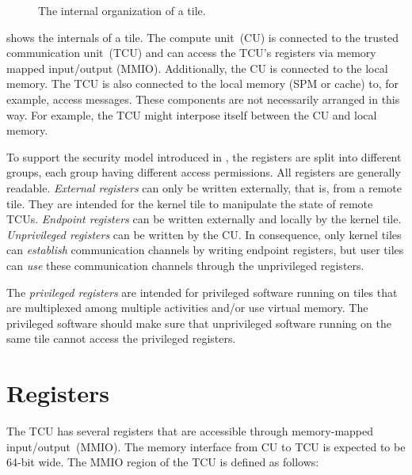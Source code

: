 \begin{figure}[h]
  \caption{The internal organization of a tile.}
  \label{fig:tileinternal}
\end{figure}

 shows the internals of a tile. The compute unit~(CU) is
connected to the trusted communication unit~(TCU) and can access the TCU's registers via memory
mapped input/output (MMIO). Additionally, the CU is connected to the local memory. The TCU is also
connected to the local memory (SPM or cache) to, for example, access messages. These components are
not necessarily arranged in this way. For example, the TCU might interpose itself between the CU and
local memory.

To support the security model introduced in , the registers are split into
different groups, each group having different access permissions. All registers are generally
readable. \emph{External registers} can only be written externally, that is, from a remote tile. They
are intended for the kernel tile to manipulate the state of remote TCUs. \emph{Endpoint registers} can
be written externally and locally by the kernel tile. \emph{Unprivileged registers} can be written by
the CU. In consequence, only kernel tiles can \emph{establish} communication channels by writing
endpoint registers, but user tiles can \emph{use} these communication channels through the
unprivileged registers.

 The \emph{privileged registers} are intended for privileged software running on tiles
that are multiplexed among multiple activities and/or use virtual memory. The privileged software should
make sure that unprivileged software running on the same tile cannot access the privileged registers.
\extend{}

\section{Registers}

The TCU has several registers that are accessible through memory-mapped input/output~(MMIO). The
memory interface from CU to TCU is expected to be 64-bit wide. The MMIO region of the TCU is defined
as follows:

